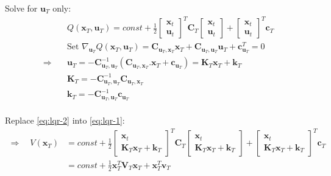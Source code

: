 Solve for $\textbf{u}_T$ only:
\begin{align}
	&Q(\textbf{x}_T, \textbf{u}_T) = const + \frac{1}{2} \begin{bmatrix}
		\textbf{x}_t\\
		\textbf{u}_t
	\end{bmatrix}^T \textbf{C}_T \begin{bmatrix}
		\textbf{x}_t\\
		\textbf{u}_t
	\end{bmatrix} + \begin{bmatrix}
		\textbf{x}_t\\
		\textbf{u}_t
	\end{bmatrix}^T \textbf{c}_T \label{eq:lqr-1}\\
	&\text{Set } \nabla_{\textbf{u}_T} Q(\textbf{x}_T, \textbf{u}_T) = \textbf{C}_{\textbf{u}_T, \textbf{x}_T} \textbf{x}_T + \textbf{C}_{\textbf{u}_T, \textbf{u}_T} \textbf{u}_T + \textbf{c}_{\textbf{u}_T}^T = 0\\
	\Rightarrow\quad &\textbf{u}_T = - \textbf{C}^{-1}_{\textbf{u}_T, \textbf{u}_T} (\textbf{C}_{\textbf{u}_T, \textbf{x}_T}.\textbf{x}_T + \textbf{c}_{\textbf{u}_T}) = \textbf{K}_T \textbf{x}_T + \textbf{k}_T \label{eq:lqr-2}\\
	&\textbf{K}_T = - \textbf{C}^{-1}_{\textbf{u}_T, \textbf{u}_T} \textbf{C}_{\textbf{u}_T, \textbf{x}_T}\\
	&\textbf{k}_T = - \textbf{C}^{-1}_{\textbf{u}_T, \textbf{u}_T} \textbf{c}_{\textbf{u}_T}\\
\end{align}

Replace \eqref{eq:lqr-2} into \eqref{eq:lqr-1}:
\begin{align}
	\Rightarrow\quad V(\textbf{x}_T) &= const + \frac{1}{2} \begin{bmatrix}
		\textbf{x}_t\\
		\textbf{K}_T \textbf{x}_T + \textbf{k}_T
	\end{bmatrix}^T \textbf{C}_T \begin{bmatrix}
		\textbf{x}_t\\
		\textbf{K}_T \textbf{x}_T + \textbf{k}_T
	\end{bmatrix} + \begin{bmatrix}
		\textbf{x}_t\\
		\textbf{K}_T \textbf{x}_T + \textbf{k}_T
	\end{bmatrix}^T \textbf{c}_T\\
	&= const + \frac{1}{2} \textbf{x}_T^T \textbf{V}_T \textbf{x}_T + \textbf{x}_T^T \textbf{v}_T
\end{align}

